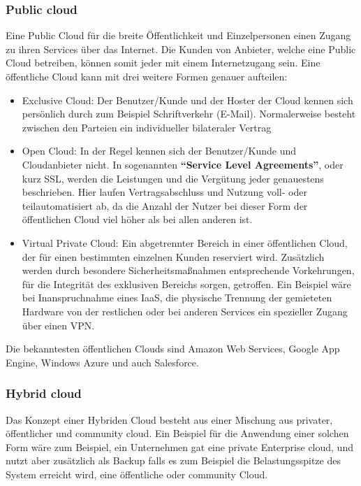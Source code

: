 \subsubsection{Public cloud}
Eine Public Cloud für die breite Öffentlichkeit und Einzelpersonen einen Zugang zu ihren Services über das Internet. Die Kunden von Anbieter, welche eine Public Cloud betreiben, können somit jeder mit einem Internetzugang sein. Eine öffentliche Cloud kann mit drei weitere Formen genauer aufteilen:
\begin{itemize}
	\item Exclusive Cloud: Der Benutzer/Kunde und der Hoster der Cloud kennen sich persönlich durch zum Beispiel Schriftverkehr (E-Mail). Normalerweise besteht zwischen den Parteien ein individueller bilateraler Vertrag
	\item Open Cloud: In der Regel kennen sich der Benutzer/Kunde und Cloudanbieter nicht. In sogenannten \textbf{"`Service Level Agreements"'}, oder kurz SSL, werden die Leistungen und die Vergütung jeder genauestens beschrieben. Hier laufen Vertragsabschluss und Nutzung voll- oder teilautomatisiert ab, da die Anzahl der Nutzer bei dieser Form der öffentlichen Cloud viel höher als bei allen anderen ist.
	\item Virtual Private Cloud: Ein abgetrennter Bereich in einer öffentlichen Cloud, der für einen bestimmten einzelnen Kunden reserviert wird. Zusätzlich werden durch besondere Sicherheitsmaßnahmen entsprechende Vorkehrungen, für die Integrität des exklusiven Bereichs sorgen, getroffen. Ein Beispiel wäre bei Inanspruchnahme eines IaaS, die physische Trennung der gemieteten Hardware von der restlichen oder bei anderen Services ein spezieller Zugang über einen VPN.
\end{itemize}

Die bekanntesten öffentlichen Clouds sind Amazon Web Services, Google App Engine, Windows Azure und auch Salesforce.

\subsubsection{Hybrid cloud}
Das Konzept einer Hybriden Cloud besteht aus einer Mischung aus privater, öffentlicher und community cloud. Ein Beispiel für die Anwendung einer solchen Form wäre zum Beispiel, ein Unternehmen gat eine private Enterprise cloud, und nutzt aber zusätzlich als Backup falls es zum Beispiel die Belastungsspitze des System erreicht wird, eine öffentliche oder community Cloud.

